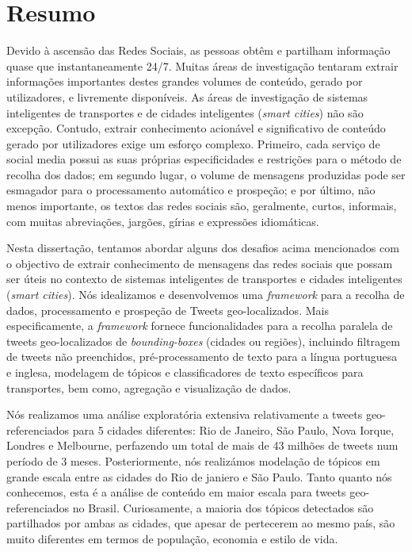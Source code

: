 \chapter*{Resumo}

Devido à ascensão das Redes Sociais, as pessoas obtêm e partilham informação quase que instantaneamente 24/7. Muitas áreas de investigação tentaram extrair informações importantes destes grandes volumes de conteúdo, gerado por utilizadores, e livremente disponíveis. As áreas de investigação de sistemas inteligentes de transportes e de cidades inteligentes (\textit{smart cities}) não são excepção. Contudo, extrair conhecimento acionável e significativo de conteúdo gerado por utilizadores exige um esforço complexo. Primeiro, cada serviço de social media possui as suas próprias especificidades e restrições para o método de recolha dos dados; em segundo lugar, o volume de mensagens produzidas pode ser esmagador para o processamento automático e prospeção; e por último, não menos importante, os textos das redes sociais são, geralmente, curtos, informais, com muitas abreviações, jargões, gírias e expressões idiomáticas. 

Nesta dissertação, tentamos abordar alguns dos desafios acima mencionados com o objectivo de extrair conhecimento de mensagens das redes sociais que possam ser úteis no contexto de sistemas inteligentes de transportes e cidades inteligentes (\textit{smart cities}). Nós idealizamos e desenvolvemos uma \textit{framework} para a recolha de dados, processamento e prospeção de Tweets geo-localizados. Mais especificamente, a \textit{framework} fornece funcionalidades para a recolha paralela de tweets geo-localizados de \textit{bounding-boxes} (cidades ou regiões), incluindo filtragem de tweets não preenchidos, pré-processamento de texto para a língua portuguesa e inglesa, modelagem de tópicos e classificadores de texto específicos para transportes, bem como, agregação e visualização de dados.

Nós realizamos uma análise exploratória extensiva relativamente a tweets geo-referenciados para 5 cidades diferentes: Rio de Janeiro, São Paulo, Nova Iorque, Londres e Melbourne, perfazendo um total de mais de 43 milhões de tweets num período de 3 meses. Posteriormente, nós realizámos modelação de tópicos em grande escala entre as cidades do Rio de janiero e São Paulo. Tanto quanto nós conhecemos, esta é a análise de conteúdo em maior escala para tweets  geo-referenciados no Brasil. Curiosamente, a maioria dos tópicos detectados são partilhados por ambas as cidades, que apesar de pertecerem ao mesmo país, são muito diferentes em termos de população, economia e estilo de vida.

